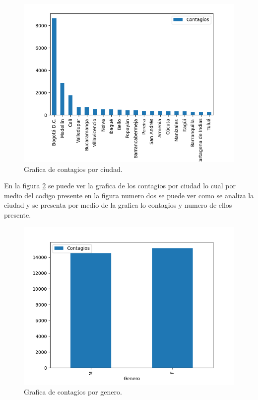 \documentclass[conference,compsoc,onecolumn]{IEEEtran}
\begin{document}
\begin{figure}[h!]
    \centering
    \includegraphics[scale=0.4]{images/Contagios_Por_Ciudad.png}
    \caption{Grafica de contagios por ciudad.}
    \label{fig:fig1}
\end{figure}

En la figura \ref{fig:barrasCiudad} se puede ver la grafica de los contagios por ciudad lo cual por medio del codigo presente en la figura numero dos se puede ver como se analiza la ciudad y se presenta por medio de la grafica lo contagios y numero de ellos presente.\\

\begin{figure}[h!]
    \centering
    \includegraphics[scale=0.4]{images/Contagios_Por_Genero.png}
    \caption{Grafica de contagios por genero.}
    \label{fig:barrasCiudad}
\end{figure}
\end{document}
